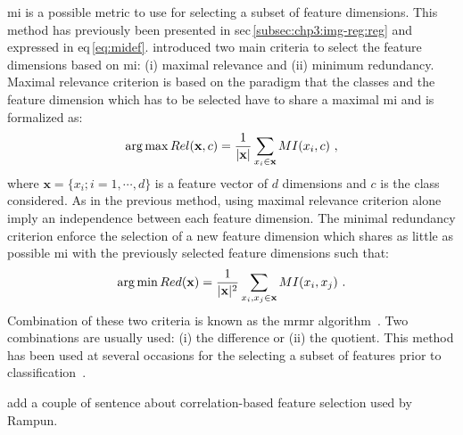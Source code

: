 \Ac{mi} is a possible metric to use for selecting a subset of feature dimensions.
This method has previously been presented in \acs{sec}\,\ref{subsec:chp3:img-reg:reg} and expressed in \acs{eq}\,\eqref{eq:midef}.
\citeauthor{Peng2005} introduced two main criteria to select the feature dimensions based on \ac{mi}: (i) maximal relevance and (ii) minimum redundancy.
Maximal relevance criterion is based on the paradigm that the classes and the feature dimension which has to be selected have to share a maximal \ac{mi} and is formalized as:
\begin{equation}
  \operatorname*{arg\,max} Rel(\mathbf{x},c) = \frac{1}{|\mathbf{x}|} \sum_{x_i \in \mathbf{x}} MI(x_i,c)  \ , 
  \label{eq:mRel}
\end{equation}
\noindent where $\mathbf{x} = \{x_i; i=1,\cdots,d\}$ is a feature vector of $d$ dimensions and $c$ is the class considered.
As in the previous method, using maximal relevance criterion alone imply an independence between each feature dimension.
The minimal redundancy criterion enforce the selection of a new feature dimension which shares as little as possible \ac{mi} with the previously selected feature dimensions such that:
\begin{equation}
  \operatorname*{arg\,min} Red(\mathbf{x}) = \frac{1}{|\mathbf{x}|^2} \sum_{x_i,x_j \in \mathbf{x}} MI(x_i,x_j)  \ . 
  \label{eq:mRed}
\end{equation}
Combination of these two criteria is known as the \ac{mrmr} algorithm~\cite{Peng2005}.
Two combinations are usually used: (i) the difference or (ii) the quotient.
This method has been used at several occasions for the selecting a subset of features prior to classification~\cite{Niaf2011,Niaf2012,lehaire2014computer,Viswanath2012,khalvati2015automated,chung2015prostate}.

{\color{red} add a couple of sentence about correlation-based feature selection used by Rampun}.

